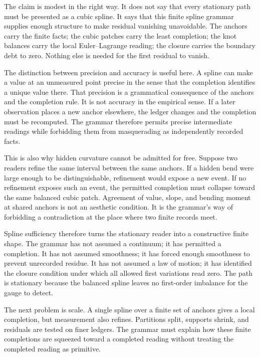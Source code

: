 The claim is modest in the right way. It does not say that every stationary
path must be presented as a cubic spline. It says that this finite spline
grammar supplies enough structure to make residual vanishing unavoidable.
The anchors carry the finite facts; the cubic patches carry the least
completion; the knot balances carry the local Euler--Lagrange reading; the
closure carries the boundary debt to zero. Nothing else is needed for the
first residual to vanish.

The distinction between precision and accuracy is useful here. A spline can
make a value at an unmeasured point precise in the sense that the completion
identifies a unique value there. That precision is a grammatical
consequence of the anchors and the completion rule. It is not accuracy in
the empirical sense. If a later observation places a new anchor elsewhere,
the ledger changes and the completion must be recomputed. The grammar
therefore permits precise intermediate readings while forbidding them from
masquerading as independently recorded facts.

This is also why hidden curvature cannot be admitted for free. Suppose two
readers refine the same interval between the same anchors. If a hidden bend
were large enough to be distinguishable, refinement would expose a new
event. If no refinement exposes such an event, the permitted completion
must collapse toward the same balanced cubic patch. Agreement of value,
slope, and bending moment at shared anchors is not an aesthetic condition.
It is the grammar's way of forbidding a contradiction at the place where
two finite records meet.

Spline sufficiency therefore turns the stationary reader into a constructive
finite shape. The grammar has not assumed a continuum; it has permitted a
completion. It has not assumed smoothness; it has forced enough smoothness
to prevent unrecorded residue. It has not assumed a law of motion; it has
identified the closure condition under which all allowed first variations
read zero. The path is stationary because the balanced spline leaves no
first-order imbalance for the gauge to detect.

The next problem is scale. A single spline over a finite set of anchors
gives a local completion, but measurement also refines. Partitions split,
supports shrink, and residuals are tested on finer ledgers. The grammar
must explain how these finite completions are squeezed toward a completed
reading without treating the completed reading as primitive.
